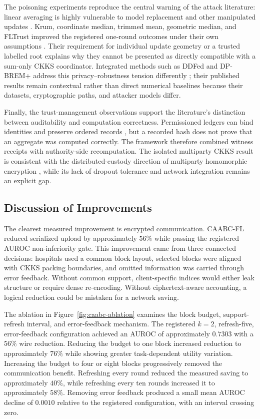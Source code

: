 The poisoning experiments reproduce the central warning of the attack literature: linear averaging is highly vulnerable to model replacement and other manipulated updates \cite{bagdasaryan2020backdoor,fang2020local}. Krum, coordinate median, trimmed mean, geometric median, and FLTrust improved the registered one-round outcomes under their own assumptions \cite{blanchard2017krum,yin2018byzantine,pillutla2022robust,cao2021fltrust}. Their requirement for individual update geometry or a trusted labelled root explains why they cannot be presented as directly compatible with a sum-only CKKS coordinator. Integrated methods such as DDFed and DP-BREM+ address this privacy--robustness tension differently \cite{xu2024ddfed,gu2025dpbrem}; their published results remain contextual rather than direct numerical baselines because their datasets, cryptographic paths, and attacker models differ.

Finally, the trust-management observations support the literature's distinction between auditability and computation correctness. Permissioned ledgers can bind identities and preserve ordered records \cite{androulaki2018hyperledger}, but a recorded hash does not prove that an aggregate was computed correctly. The framework therefore combined witness receipts with authority-side recomputation. The isolated multiparty CKKS result is consistent with the distributed-custody direction of multiparty homomorphic encryption \cite{mouchet2021multiparty}, while its lack of dropout tolerance and network integration remains an explicit gap.

\subsection{Discussion of Improvements}
\label{subsec:discussion-improvements}

The clearest measured improvement is encrypted communication. CAABC-FL reduced serialized upload by approximately $56\%$ while passing the registered AUROC non-inferiority gate. This improvement came from three connected decisions: hospitals used a common block layout, selected blocks were aligned with CKKS packing boundaries, and omitted information was carried through error feedback. Without common support, client-specific indices would either leak structure or require dense re-encoding. Without ciphertext-aware accounting, a logical reduction could be mistaken for a network saving.

The ablation in Figure~\ref{fig:caabc-ablation} examines the block budget, support-refresh interval, and error-feedback mechanism. The registered $k=2$, refresh-five, error-feedback configuration achieved an AUROC of approximately $0.7303$ with a $56\%$ wire reduction. Reducing the budget to one block increased reduction to approximately $76\%$ while showing greater task-dependent utility variation. Increasing the budget to four or eight blocks progressively removed the communication benefit. Refreshing every round reduced the measured saving to approximately $40\%$, while refreshing every ten rounds increased it to approximately $58\%$. Removing error feedback produced a small mean AUROC decline of $0.0010$ relative to the registered configuration, with an interval crossing zero.

